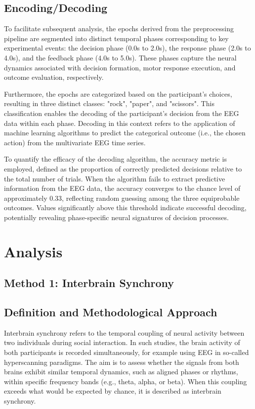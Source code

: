 \documentclass{article}
\theoremstyle{plain}
\theoremstyle{definition}
\theoremstyle{remark}
\begin{document}
\subsection{Encoding/Decoding}

To facilitate subsequent analysis, the epochs derived from the preprocessing pipeline are segmented into distinct temporal phases corresponding to key experimental events: the decision phase (0.0s to 2.0s), the response phase (2.0s to 4.0s), and the feedback phase (4.0s to 5.0s). These phases capture the neural dynamics associated with decision formation, motor response execution, and outcome evaluation, respectively.

Furthermore, the epochs are categorized based on the participant's choices, resulting in three distinct classes: "rock", "paper", and "scissors". This classification enables the decoding of the participant's decision from the EEG data within each phase. Decoding in this context refers to the application of machine learning algorithms to predict the categorical outcome (i.e., the chosen action) from the multivariate EEG time series.

To quantify the efficacy of the decoding algorithm, the accuracy metric is employed, defined as the proportion of correctly predicted decisions relative to the total number of trials. When the algorithm fails to extract predictive information from the EEG data, the accuracy converges to the chance level of approximately 0.33, reflecting random guessing among the three equiprobable outcomes. Values significantly above this threshold indicate successful decoding, potentially revealing phase-specific neural signatures of decision processes.

\section{Analysis}
\subsection{Method 1: Interbrain Synchrony} 
\subsection{Definition and Methodological Approach}
Interbrain synchrony refers to the temporal coupling of neural activity between two individuals during social interaction. In such studies, the brain activity of both participants is recorded simultaneously, for example using EEG in so-called hyperscanning paradigms. The aim is to assess whether the signals from both brains exhibit similar temporal dynamics, such as aligned phases or rhythms, within specific frequency bands (e.g., theta, alpha, or beta). When this coupling exceeds what would be expected by chance, it is described as interbrain synchrony.
\end{document}
